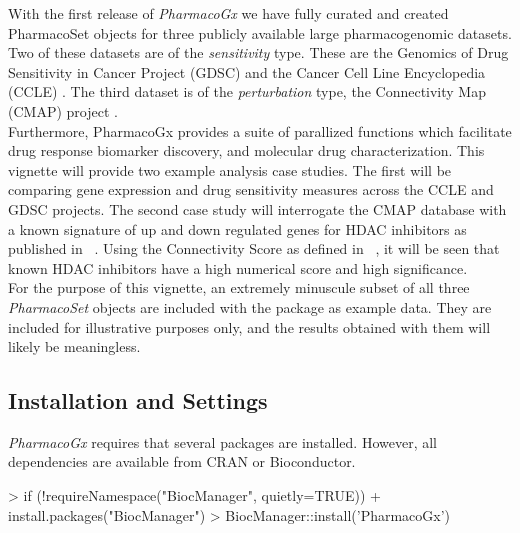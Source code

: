 \documentclass[11pt]{article}
\begin{document}
With the first release of \textit{PharmacoGx} we have fully curated and
created PharmacoSet objects for three publicly available large pharmacogenomic
datasets. Two of these datasets are of the \textit{sensitivity} type. These
are the Genomics of Drug Sensitivity in Cancer Project (GDSC) \cite{garnett_systematic_2012} and the Cancer 
Cell Line Encyclopedia (CCLE) \cite{barretina_cancer_2012}. The third dataset is of the
\textit{perturbation} type, the Connectivity Map (CMAP) project
\cite{lamb_connectivity_2006}.\\

Furthermore, PharmacoGx provides a suite of parallized functions which
facilitate drug response biomarker discovery, and molecular drug
characterization. This vignette will provide two example analysis case
studies. The first will be comparing gene expression and drug sensitivity
measures across the CCLE and GDSC projects. The second case study will
interrogate the CMAP database with a known signature of up and down regulated
genes for HDAC inhibitors as published in ~\cite{glaser_gene_2003}. Using the
Connectivity Score as defined in ~\cite{lamb_connectivity_2006}, it will be seen that
known HDAC inhibitors have a high numerical score and high significance.\\ 

For the purpose of this vignette, an extremely minuscule subset of all three
\textit{PharmacoSet} objects are included with the package as example data.
They are included for illustrative purposes only, and the results obtained
with them will likely be meaningless.\\


\subsection{Installation and Settings}

\textit{PharmacoGx} requires that several packages are installed. However, all dependencies are available from CRAN or Bioconductor.

\begin{Schunk}
\begin{Sinput}
> if (!requireNamespace("BiocManager", quietly=TRUE))
+     install.packages("BiocManager")
> BiocManager::install('PharmacoGx')
\end{Sinput}
\end{Schunk}
\end{document}
